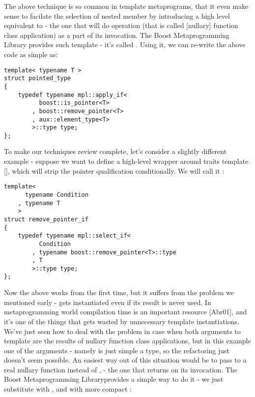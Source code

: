 \documentclass{netobjectdays}
\newcommand{\Mpl}{Boost Meta\-program\-ming Library}
\begin{document}
The above technique is so common in template metaprograms, that it
even make sense to facilate the selection of nested  member
by introducing a high level equivalent to  - the one
that will do  operation (that is called [nullary]
function class application) as a part of its invocation.  The \Mpl
provides such template - it's called . Using it, we
can re-write the above code as simple as:

{\footnotesize
\begin{verbatim}
template< typename T >
struct pointed_type
{
    typedef typename mpl::apply_if<
          boost::is_pointer<T>
        , boost::remove_pointer<T>
        , aux::element_type<T>
        >::type type;
};
\end{verbatim}
}

To make our techniques review complete, let's consider a slightly 
different example - suppose we want to define a high-level wrapper 
around  traits template [], which will 
strip the pointer qualification conditionally. We will call it 
:

{\footnotesize
\begin{verbatim}
template<
      typename Condition
    , typename T
    >
struct remove_pointer_if
{
    typedef typename mpl::select_if<
          Condition
        , typename boost::remove_pointer<T>::type
        , T
        >::type type;
};
\end{verbatim}
}

Now the above works from the first time, but it suffers from the 
problem we mentioned early -  gets 
instantiated even if its result is never used. In metaprogramming 
world compilation time is an important resource [Abr01], and it's 
one of the things that gets wasted by unnecessary template 
instantiations. We've just seen how to deal with the problem in 
case when both arguments to  template are the 
results of nullary function class applications, but in this example 
one of the arguments - namely  is just simple a type, so 
the refactoring just doesn't seem possible. An easiest way out of 
this situation would be to pass to  a real 
nullary function instead of , - the one that returns 
 on its invocation. The \Mpl provides a simple way to do it -
we just substitute  with ,
and  with more compact 
:
\end{document}
